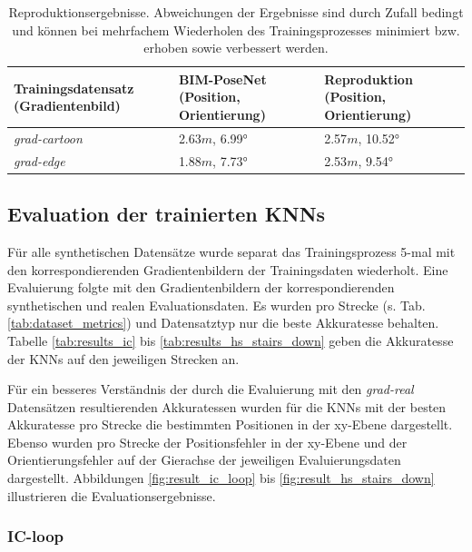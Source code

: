 \begin{table}[b]
	\centering
	\caption{Reproduktionsergebnisse. Abweichungen der Ergebnisse sind durch Zufall bedingt und können bei mehrfachem Wiederholen des Trainingsprozesses minimiert bzw. erhoben sowie verbessert werden. }
	\begin{tabularx}{1.0\textwidth}{X X X}
		\textbf{Trainingsdatensatz} \hspace{2cm} (Gradientenbild) & \textbf{BIM-PoseNet} \hspace{2cm} (Position, Orientierung) & \textbf{Reproduktion} \hspace{2cm} (Position, Orientierung)\\
		\hline
	 \textit{grad-cartoon} & 2.63$m$, 6.99° & 2.57$m$, 10.52°\\
		\hline
		\textit{grad-edge} & 1.88$m$, 7.73°  & 2.53$m$, 9.54°\\
	\end{tabularx}
	\label{tab:reproduction}
\end{table}





\subsection{Evaluation der trainierten KNNs}
Für alle synthetischen Datensätze wurde separat das Trainingsprozess 5-mal mit den korrespondierenden Gradientenbildern der Trainingsdaten wiederholt. Eine Evaluierung folgte mit den Gradientenbildern der korrespondierenden synthetischen und realen Evaluationsdaten. Es wurden pro Strecke (s. Tab. \ref{tab:dataset_metrics}) und Datensatztyp nur die beste Akkuratesse behalten. Tabelle \ref{tab:results_ic} bis \ref{tab:results_hs_stairs_down} geben die Akkuratesse der KNNs auf den jeweiligen Strecken an. 

Für ein besseres Verständnis der durch die Evaluierung mit den \textit{grad-real} Datensätzen resultierenden Akkuratessen wurden für die KNNs mit der besten Akkuratesse pro Strecke die bestimmten Positionen in der xy-Ebene dargestellt. Ebenso wurden pro Strecke der Positionsfehler in der xy-Ebene und der Orientierungsfehler auf der Gierachse der jeweiligen Evaluierungsdaten dargestellt. Abbildungen \ref{fig:result_ic_loop} bis \ref{fig:result_hs_stairs_down} illustrieren die Evaluationsergebnisse.


\subsubsection{IC-loop}

